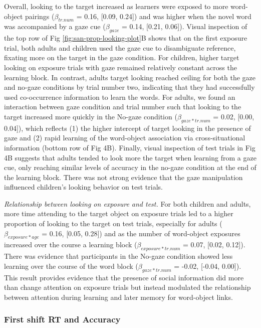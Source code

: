 \documentclass[10pt, letterpaper]{article}
\begin{document}
Overall, looking to the target increased as learners were exposed to
more word-object pairings (\(\beta_{tr.num}\) = 0.16, {[}0.09, 0.24{]})
and was higher when the novel word was accompanied by a gaze cue
(\(\beta_{gaze}\) = 0.14, {[}0.21, 0.06{]}). Visual inspection of the
top row of Fig \ref{fig:san-prop-looking-plot}B shows that on the first
exposure trial, both adults and children used the gaze cue to
disambiguate reference, fixating more on the target in the gaze
condition. For children, higher target looking on exposure trials with
gaze remained relatively constant across the learning block. In
contrast, adults target looking reached ceiling for both the gaze and
no-gaze conditions by trial number two, indicating that they had
successfully used co-occurrence information to learn the words. For
adults, we found an interaction between gaze condition and trial number
such that looking to the target increased more quickly in the No-gaze
condition (\(\beta_{gaze*tr.num}\) = 0.02, {[}0.00, 0.04{]}), which
reflects (1) the higher intercept of target looking in the presence of
gaze and (2) rapid learning of the word-object association via
cross-situational information (bottom row of Fig 4B). Finally, visual
inspection of test trials in Fig 4B suggests that adults tended to look
more the target when learning from a gaze cue, only reaching similar
levels of accuracy in the no-gaze condition at the end of the learning
block. There was not strong evidence that the gaze manipulation
influenced children's looking behavior on test trials.

\emph{Relationship between looking on exposure and test.} For both
children and adults, more time attending to the target object on
exposure trials led to a higher proportion of looking to the target on
test trials, especially for adults (\(\beta_{exposure*age}\) = 0.16,
{[}0.05, 0.28{]}) and as the number of word-object exposures increased
over the course a learning block (\(\beta_{exposure*tr.num}\) = 0.07,
{[}0.02, 0.12{]}). There was evidence that participants in the No-gaze
condition showed less learning over the course of the word block
(\(\beta_{gaze*tr.num}\) = -0.02, {[}-0.04, 0.00{]}). This result
provides evidence that the presence of social information did more than
change attention on exposure trials but instead modulated the
relationship between attention during learning and later memory for
word-object links.

\hypertarget{first-shift-rt-and-accuracy-1}{%
\subsubsection{First shift RT and
Accuracy}\label{first-shift-rt-and-accuracy-1}}
\end{document}
